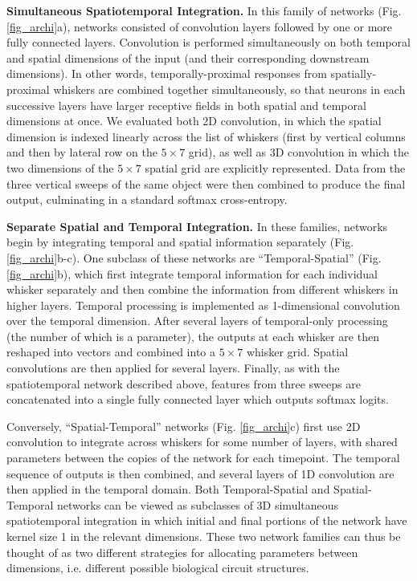 \textbf{Simultaneous Spatiotemporal Integration.}
In this family of networks (Fig. \ref{fig_archi}a), networks consisted of convolution layers followed by one or more fully connected layers.  Convolution is performed simultaneously on both temporal and spatial dimensions of the input (and their corresponding downstream dimensions). In other words, temporally-proximal responses from spatially-proximal whiskers are combined together simultaneously, so that neurons in each successive layers have larger receptive fields in both spatial and temporal dimensions at once.
We evaluated both 2D convolution, in which the spatial dimension is indexed linearly across the list of whiskers (first by vertical columns and then by lateral row on the $5\times7$ grid), as well as 3D convolution in which the two dimensions of the $5\times7$ spatial grid are explicitly represented.
Data from the three vertical sweeps of the same object were then combined to produce the final output, culminating in a standard softmax cross-entropy.  


\textbf{Separate Spatial and Temporal Integration.} In these families, networks begin by integrating temporal and spatial information separately (Fig. \ref{fig_archi}b-c).  
One subclass of these networks are ``Temporal-Spatial''  (Fig. \ref{fig_archi}b), which first integrate temporal information for each individual whisker separately and then combine the information from different whiskers in higher layers.
Temporal processing is implemented as 1-dimensional convolution over the temporal dimension. 
After several layers of temporal-only processing (the number of which is a parameter), the outputs at each whisker are then reshaped into vectors and combined into a $5\times7$ whisker grid.  Spatial convolutions are then applied for several layers. 
Finally, as with the spatiotemporal network described above, features from three sweeps are concatenated into a single fully connected layer which outputs softmax logits.

Conversely, ``Spatial-Temporal'' networks (Fig. \ref{fig_archi}c) first use 2D convolution to integrate across whiskers for some number of layers, with shared parameters between the copies of the network for each timepoint.  The temporal sequence of outputs is then combined, and several layers of 1D convolution are then applied in the temporal domain.  
Both Temporal-Spatial and Spatial-Temporal networks can be viewed as subclasses of 3D simultaneous spatiotemporal integration in which initial and final portions of the network have kernel size 1 in the relevant dimensions.  
These two network families can thus be thought of as two different strategies for allocating parameters between dimensions, i.e. different possible biological circuit structures.


